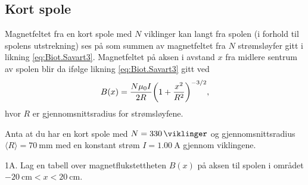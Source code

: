 \documentclass[../Elmag-labhefte-2020.tex]{subfiles}
\begin{document}
\subsection{Kort spole}

Magnetfeltet fra en kort spole med $N$ viklinger kan langt fra spolen (i forhold til spolens utstrekning) ses på som summen av magnetfeltet fra $N$ strømsløyfer gitt i likning \eqref{eq:Biot.Savart3}. Magnetfeltet på aksen i avstand $x$ fra midlere sentrum av spolen blir da ifølge likning \eqref{eq:Biot.Savart3} gitt ved 
%
\begin{equation}
    B(x) = \frac{N\mu_0 I}{2 R} \qty(1 + \frac{x^{2}}{R^{2}})^{-3/2},
    \label{eq:kort.spole}
\end{equation}
%
hvor $R$ er gjennomsnittsradius for strømsløyfene. 

Anta at du har en kort spole med $N = \SI{330}{\viklinger}$ og gjennomsnittsradius $\langle R \rangle  = \SI{70}{\mm}$ med en konstant strøm $I = \SI{1,00}{\ampere}$ gjennom viklingene.

{\itsf 1A. Lag en tabell over magnetflukstettheten $B(x)$ på aksen til spolen i området $-\SI{20}{\cm} < x < \SI{20}{\cm}$.}  
\end{document}

